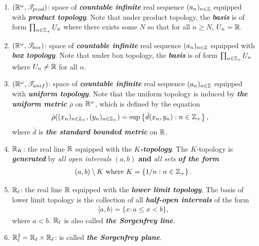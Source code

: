 \documentclass[11pt]{article}
\begin{document}
\begin{enumerate}
\item $({\mathbb R}^{\omega}, {\mathscr T}_{prod})$: space of \emph{\textbf{countable infinite}} real sequence $(a_n)_{n \in {\mathbb Z}}$ equipped with \emph{\textbf{product topology}}. Note that under product topology, the \emph{\textbf{basis}} is of form $\prod_{n\in {\mathbb Z}_{+}}U_n$ where there exists some $N$ so that for all $n \ge N$, $U_n = {\mathbb R}$.

\item $({\mathbb R}^{\omega}, {\mathscr T}_{box})$: space of \emph{\textbf{countable infinite}} real sequence $(a_n)_{n \in {\mathbb Z}}$ equipped with \emph{\textbf{box topology}}. Note that under box topology, the \emph{\textbf{basis}} is of form $\prod_{n\in {\mathbb Z}_{+}}U_n$ where $U_n \neq {\mathbb R}$ for all $n$.

\item $({\mathbb R}^{\omega}, {\mathscr T}_{unif})$: space of \emph{\textbf{countable infinite}} real sequence $(a_n)_{n \in {\mathbb Z}}$ equipped with \emph{\textbf{uniform topology}}. Note that the uniform topology is induced by \emph{\textbf{the uniform metric}} $\bar{\rho}$ on ${\mathbb R}^{\omega}$, which is defined by the equation
\begin{align*}
\bar{\rho}((x_n)_{n \in {\mathbb Z}_{+}}, (y_n)_{n \in {\mathbb Z}_{+}}) &= \sup\left\{\bar{d}(x_{n}, y_{n}): n \in {\mathbb Z}_{+}\right\},
\end{align*}
where $\bar{d}$ is \emph{\textbf{the standard bounded metric}} on ${\mathbb R}$.

\item ${\mathbb R}_{K}$: the real line ${\mathbb R}$ equipped with the \emph{\textbf{$K$-topology}}. The $K$-topology is \emph{\textbf{generated}} by \emph{all open intervals} $(a, b)$ \textbf{and} \emph{all sets \textbf{of the form}} 
\begin{align*}
(a,b) \setminus K\text{ where }K = \left\{1/n: n \in {\mathbb Z}_{+}\right\}.
\end{align*}

\item ${\mathbb R}_{\ell}$: the real line ${\mathbb R}$ equipped with the \emph{\textbf{lower limit topology}}. The basis of lower limit topology is  the collection of all \emph{\textbf{half-open intervals}} of the form
\begin{align*}
[a,b) = \{x: a \le  x < b\},
\end{align*} where $a < b$. ${\mathbb R}_{\ell}$ is also called \emph{\textbf{the Sorgenfrey line}}.

\item ${\mathbb R}_{\ell}^2 = {\mathbb R}_{\ell} \times {\mathbb R}_{\ell}$: is called \emph{\textbf{the Sorgenfrey plane}}.


\end{enumerate}
\end{document}
